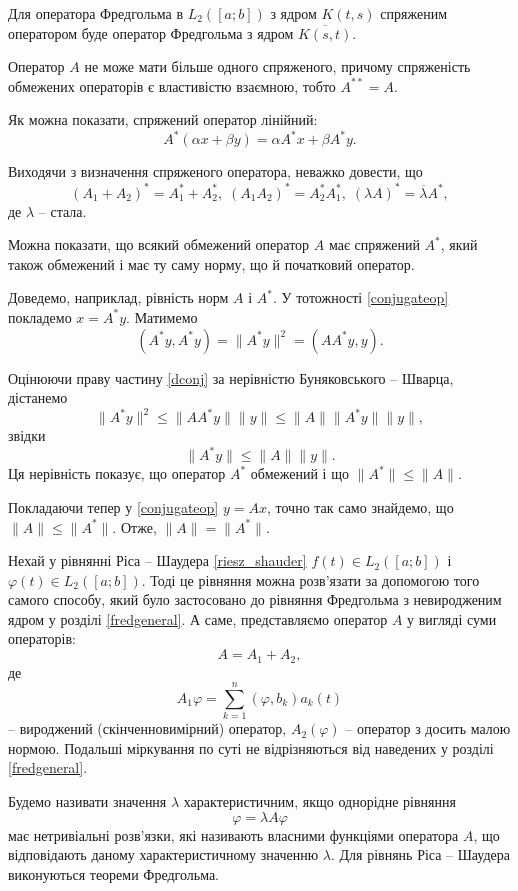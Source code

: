 \documentclass[14pt,twoside]{extreport}
\theoremstyle{mystyle}
\numberwithin{equation}{chapter}
\begin{document}
Для оператора Фредгольма в $L_2([a; b])$ з ядром $K(t, s)$ спряженим оператором буде оператор Фредгольма з ядром $\overline{K(s, t)}$.

Оператор $A$ не може мати більше одного спряженого, причому спряженість обмежених операторів є властивістю взаємною, тобто $A^{**} = A$.

Як можна показати, спряжений оператор лінійний:
\[
A^{*}(\alpha x + \beta y) = \alpha A^{*}x + \beta A^{*} y.
\]

Виходячи з визначення спряженого оператора, неважко довести, що
\[
(A_1 + A_2)^{*} = A_1^{*} + A_2^{*}, \; (A_1A_2)^{*} = A_2^{*}A_1^{*}, \; (\lambda A)^{*} = \overline{\lambda} A^{*},
\]
де $\lambda$ -- стала.

Можна показати, що всякий обмежений оператор $A$ має спряжений $A^{*}$, який також обмежений і має ту саму норму, що й початковий оператор.

Доведемо, наприклад, рівність норм $A$ і $A^{*}$. У тотожності \eqref{conjugateop} покладемо $x=A^{*}y$. Матимемо
\begin{equation}\label{dconj}
(A^*y, A^*y) = \|A^* y\|^2 = (AA^*y, y).
\end{equation}

Оцінюючи праву частину \eqref{dconj} за нерівністю Буняковського -- Шварца, дістанемо
\[
\|A^*y\|^2 \leqslant \|AA^*y\| \|y\| \leqslant \|A\| \|A^*y\| \|y\|,
\]
звідки
\[
\|A^*y\| \leqslant \|A\| \|y\|.
\]
Ця нерівність показує, що оператор $A^*$ обмежений і що $\|A^*\| \leqslant \|A\|$.

Покладаючи тепер у \eqref{conjugateop} $y = Ax$, точно так само знайдемо, що $\|A\| \leqslant \|A^*\|$. Отже, $\|A\| = \|A^*\|$.

Нехай у рівнянні Ріса -- Шаудера \eqref{riesz_shauder} $f(t) \in L_2([a; b])$ і $\varphi(t) \in L_2([a; b])$. Тоді це рівняння можна розв'язати за допомогою того самого способу, який було застосовано до рівняння Фредгольма з невиродженим ядром у розділі \ref{fredgeneral}. А саме, представляємо оператор $A$ у вигляді суми операторів:
\[
A=A_1+A_2,
\]
де
\[
A_1\varphi = \sum_{k=1}^{n} (\varphi, b_k) a_k(t)
\]
-- вироджений (скінченновимірний) оператор, $A_2(\varphi)$ -- оператор з досить малою нормою. Подальші міркування по суті не відрізняються від наведених у розділі \ref{fredgeneral}.

Будемо називати значення $\lambda$ характеристичним, якщо однорідне рівняння
\[
\varphi = \lambda A \varphi
\]
має нетривіальні розв'язки, які називають власними функціями оператора $A$, що відповідають даному характеристичному значенню $\lambda$. Для рівнянь Ріса -- Шаудера виконуються теореми Фредгольма.
\end{document}
